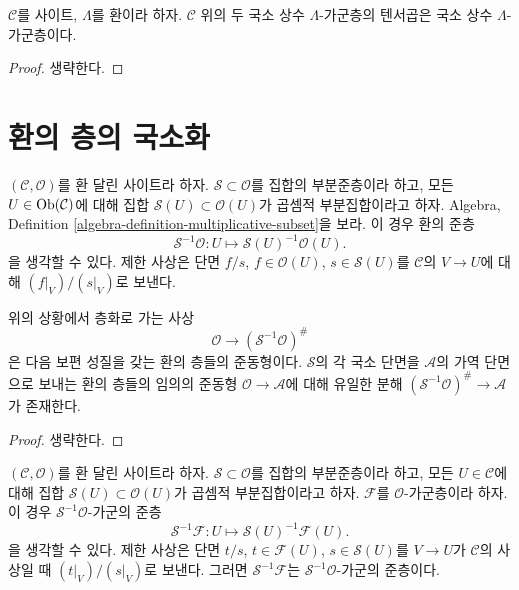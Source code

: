 \begin{lemma}
\label{lemma-tensor-product-locally-constant}
$\mathcal{C}$를 사이트, $\Lambda$를 환이라 하자. $\mathcal{C}$ 위의
두 국소 상수 $\Lambda$-가군층의 텐서곱은 국소 상수
$\Lambda$-가군층이다.
\end{lemma}

\begin{proof}
생략한다.
\end{proof}











\section{환의 층의 국소화}
\label{section-localizing-sheaves-rings}

\noindent
$(\mathcal{C}, \mathcal{O})$를 환 달린 사이트라 하자.
$\mathcal{S} \subset \mathcal{O}$를 집합의 부분준층이라 하고,
모든 $U \in \mathop{\mathrm{Ob}}\nolimits(\mathcal{C})$에 대해 집합
$\mathcal{S}(U) \subset \mathcal{O}(U)$가 곱셈적 부분집합이라고 하자.
Algebra, Definition \ref{algebra-definition-multiplicative-subset}을 보라.
이 경우 환의 준층
$$
\mathcal{S}^{-1}\mathcal{O} :
U \longmapsto \mathcal{S}(U)^{-1}\mathcal{O}(U).
$$
을 생각할 수 있다. 제한 사상은 단면
$f/s$, $f \in \mathcal{O}(U)$, $s \in \mathcal{S}(U)$를
$\mathcal{C}$의 $V \to U$에 대해 $(f|_V)/(s|_V)$로 보낸다.

\begin{lemma}
\label{lemma-simple-invert}
위의 상황에서 층화로 가는 사상
$$
\mathcal{O} \longrightarrow (\mathcal{S}^{-1}\mathcal{O})^\#
$$
은 다음 보편 성질을 갖는 환의 층들의 준동형이다. $\mathcal{S}$의
각 국소 단면을 $\mathcal{A}$의 가역 단면으로 보내는 환의 층들의
임의의 준동형 $\mathcal{O} \to \mathcal{A}$에 대해 유일한 분해
$(\mathcal{S}^{-1}\mathcal{O})^\# \to \mathcal{A}$가 존재한다.
\end{lemma}

\begin{proof}
생략한다.
\end{proof}

\noindent
$(\mathcal{C}, \mathcal{O})$를 환 달린 사이트라 하자.
$\mathcal{S} \subset \mathcal{O}$를 집합의 부분준층이라 하고,
모든 $U \in \mathcal{C}$에 대해 집합
$\mathcal{S}(U) \subset \mathcal{O}(U)$가 곱셈적 부분집합이라고 하자.
$\mathcal{F}$를 $\mathcal{O}$-가군층이라 하자. 이 경우
$\mathcal{S}^{-1}\mathcal{O}$-가군의 준층
$$
\mathcal{S}^{-1}\mathcal{F} :
U \longmapsto \mathcal{S}(U)^{-1}\mathcal{F}(U).
$$
을 생각할 수 있다. 제한 사상은 단면 $t/s$, $t \in \mathcal{F}(U)$,
$s \in \mathcal{S}(U)$를 $V \to U$가 $\mathcal{C}$의 사상일 때
$(t|_V)/(s|_V)$로 보낸다. 그러면 $\mathcal{S}^{-1}\mathcal{F}$는
$\mathcal{S}^{-1}\mathcal{O}$-가군의 준층이다.

